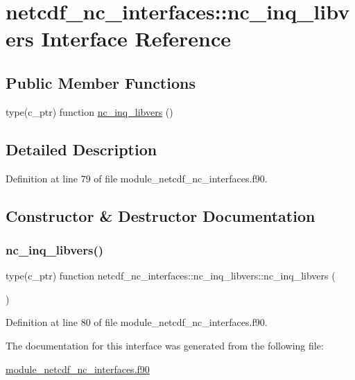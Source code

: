 \hypertarget{interfacenetcdf__nc__interfaces_1_1nc__inq__libvers}{}\section{netcdf\+\_\+nc\+\_\+interfaces\+:\+:nc\+\_\+inq\+\_\+libvers Interface Reference}
\label{interfacenetcdf__nc__interfaces_1_1nc__inq__libvers}
\subsection*{Public Member Functions}
\begin{DoxyCompactItemize}
\item 
type(c\+\_\+ptr) function \hyperlink{interfacenetcdf__nc__interfaces_1_1nc__inq__libvers_a56aecda4e092ecf408a8ae29dfb00131}{nc\+\_\+inq\+\_\+libvers} ()
\end{DoxyCompactItemize}


\subsection{Detailed Description}


Definition at line 79 of file module\+\_\+netcdf\+\_\+nc\+\_\+interfaces.\+f90.



\subsection{Constructor \& Destructor Documentation}
\mbox{\label{interfacenetcdf__nc__interfaces_1_1nc__inq__libvers_a56aecda4e092ecf408a8ae29dfb00131}} 
\subsubsection{\texorpdfstring{nc\+\_\+inq\+\_\+libvers()}{nc\_inq\_libvers()}}
{\footnotesize\ttfamily type(c\+\_\+ptr) function netcdf\+\_\+nc\+\_\+interfaces\+::nc\+\_\+inq\+\_\+libvers\+::nc\+\_\+inq\+\_\+libvers (\begin{DoxyParamCaption}{ }\end{DoxyParamCaption})}



Definition at line 80 of file module\+\_\+netcdf\+\_\+nc\+\_\+interfaces.\+f90.



The documentation for this interface was generated from the following file\+:\begin{DoxyCompactItemize}
\item 
\hyperlink{module__netcdf__nc__interfaces_8f90}{module\+\_\+netcdf\+\_\+nc\+\_\+interfaces.\+f90}\end{DoxyCompactItemize}
